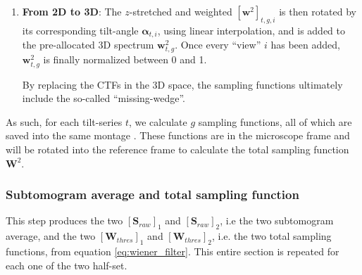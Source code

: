 \begin{enumerate}
    \item \textbf{From 2D to 3D}: The $z$-stretched and weighted ${[\bm{w}^2]}_{t,g,i}$ is then rotated by its corresponding tilt-angle $\bm{\alpha}_{t,i}$, using linear interpolation, and is added to the pre-allocated 3D spectrum $\bm{w}_{t,g}^2$. Once every ``view'' $i$ has been added, $\bm{w}_{t,g}^2$ is finally normalized between 0 and 1.
    \begin{note}By replacing the CTFs in the 3D space, the sampling functions ultimately include the so-called ``missing-wedge''.\end{note}
\end{enumerate}

As such, for each tilt-series $t$, we calculate $g$ sampling functions, all of which are saved into the same montage . These functions are in the microscope frame and will be rotated into the reference frame to calculate the total sampling function $\bm{W}^2$.

\subsubsection{Subtomogram average and total sampling function} \label{sec:algo:avg:subtomo_avg}

This step produces the two ${[\bm{S}_{raw}]}_1$ and ${[\bm{S}_{raw}]}_2$, i.e the two subtomogram average, and the two ${[\bm{W}_{thres}]}_1$ and ${[\bm{W}_{thres}]}_2$, i.e. the two total sampling functions, from equation \ref{eq:wiener_filter}. This entire section is repeated for each one of the two half-set.

